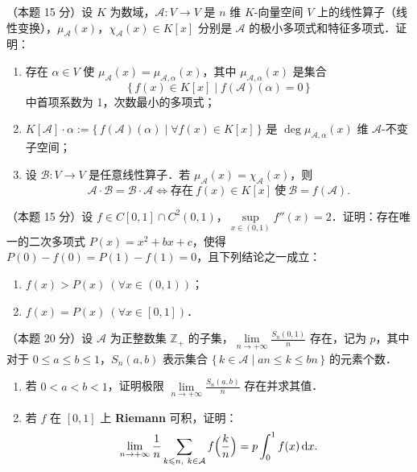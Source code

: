 \begin{problems}
\item[四、]（本题 15 分）设 $K$ 为数域，$\mathcal{A}:V\to V$ 是 $n$ 维 $K$-向量空间 $V$ 上的线性算子（线性变换），$\mu_{\mathcal{A}}(x)$，$\chi_{\mathcal{A}}(x)\in K[x]$ 分别是 $\mathcal{A}$ 的极小多项式和特征多项式．证明：
\begin{enumerate}[label=(\arabic*)]
  \item 存在 $\alpha\in V$ 使 $\mu_{\mathcal{A}}(x)=\mu_{\mathcal{A},\alpha}(x)$，其中 $\mu_{\mathcal{A},\alpha}(x)$ 是集合
  \[
    \{\,f(x)\in K[x]\mid f(\mathcal{A})(\alpha)=0\,\}
  \]
  中首项系数为 1，次数最小的多项式；
  \item $K[\mathcal{A}]\cdot\alpha:=\{\,f(\mathcal{A})(\alpha)\mid \forall f(x)\in K[x]\,\}$ 是 $\deg\mu_{\mathcal{A},\alpha}(x)$ 维 $\mathcal{A}$-不变子空间；
  \item 设 $\mathcal{B}:V\to V$ 是任意线性算子．若 $\mu_{\mathcal{A}}(x)=\chi_{\mathcal{A}}(x)$，则
  \[
    \mathcal{A}\cdot\mathcal{B}=\mathcal{B}\cdot\mathcal{A}
    \iff \text{存在}\ f(x)\in K[x]\ \text{使}\ \mathcal{B}=f(\mathcal{A}).
  \]
\end{enumerate}

\item[五、]（本题 15 分）设 $f\in C[0,1]\cap C^2(0,1)$，$\sup\limits_{x\in(0,1)}f''(x)=2$．证明：存在唯一的二次多项式 $P(x)=x^2+bx+c$，使得 $P(0)-f(0)=P(1)-f(1)=0$，且下列结论之一成立：
\begin{enumerate}[label=(\arabic*)]
  \item $f(x)>P(x)\ (\forall x\in(0,1))$；
  \item $f(x)=P(x)\ (\forall x\in[0,1])$．
\end{enumerate}

\item[六、]（本题 20 分）设 $\mathcal{A}$ 为正整数集 $\mathbb{Z}_+$ 的子集，$\lim\limits_{n\to+\infty}\frac{S_n(0,1)}{n}$ 存在，记为 $p$，其中对于 $0\leqslant a\leqslant b\leqslant 1$，$S_n(a,b)$ 表示集合 $\{\,k\in\mathcal{A}\mid an\leqslant k\leqslant bn\,\}$ 的元素个数．
\begin{enumerate}[label=(\arabic*)]
  \item 若 $0<a<b<1$，证明极限 $\lim\limits_{n\to+\infty}\frac{S_n(a,b)}{n}$ 存在并求其值．
  \item 若 $f$ 在 $[0,1]$ 上 \textbf{Riemann} 可积，证明：
  \[
    \lim_{n\to+\infty}\frac{1}{n}\sum_{k\leqslant n,\ k\in\mathcal{A}}f\Bigl(\frac{k}{n}\Bigr)=p\int_0^1 f(x)\dd x.
  \]
\end{enumerate}

\end{problems}
